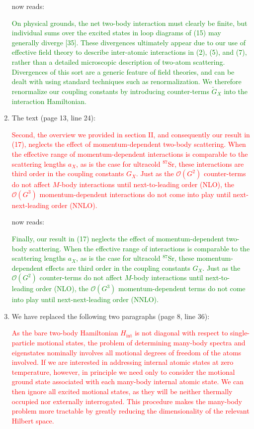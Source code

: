 \documentclass[preprint]{revtex4-1}
\renewcommand{\t}{\text} %
\newcommand{\p}[1]{\left(#1\right)} %
\renewcommand{\O}{\mathcal{O}}
\newcommand{\1}{\mathds{1}}
\newcommand{\red}[1]{\textcolor{red}{#1}}
\newcommand{\green}[1]{\textcolor{green}{#1}}
\newcounter{point}
\newcommand{\step}{\stepcounter{point}\setcounter{enumi}{0}}
\begin{document}
\begin{enumerate}[label=(R1.\arabic{point}.\arabic*)]
  now reads:

  \green{On physical grounds, the net two-body interaction must
    clearly be finite, but individual sums over the excited states in
    loop diagrams of (15) may generally diverge [35].  These
    divergences ultimately appear due to our use of effective field
    theory to describe inter-atomic interactions in (2), (5), and (7),
    rather than a detailed microscopic description of two-atom
    scattering.  Divergences of this sort are a generic feature of
    field theories, and can be dealt with using standard techniques
    such as renormalization.  We therefore renormalize our coupling
    constants by introducing counter-terms $\tilde G_X$ into the
    interaction Hamiltonian.}


\item The text (page 13, line 24):

  \red{Second, the overview we provided in section II, and
    consequently our result in (17), neglects the effect of
    momentum-dependent two-body scattering. When the effective range
    of momentum-dependent interactions is comparable to the scattering
    lengths $a_X$, as is the case for ultracold ${}^{87}$Sr, these
    interactions are third order in the coupling constants $G_X$. Just
    as the $\O\p{G^2}$ counter-terms do not affect $M$-body
    interactions until next-to-leading order (NLO), the $\O\p{G^3}$
    momentum-dependent interactions do not come into play until next-
    next-leading order (NNLO).}

  now reads:

  \green{Finally, our result in (17) neglects the effect of
    momentum-dependent two-body scattering.  When the effective range
    of interactions is comparable to the scattering lengths $a_X$, as
    is the case for ultracold ${}^{87}$Sr, these momentum-dependent
    effects are third order in the coupling constants $G_X$.  Just as
    the $\O\p{G^2}$ counter-terms do not affect $M$-body interactions
    until next-to-leading order (NLO), the $\O\p{G^3}$
    momentum-dependent terms do not come into play until
    next-next-leading order (NNLO).}


  \step
\item We have replaced the following two paragraphs (page 8, line 36):

  \red{As the bare two-body Hamiltonian $H_{\t{int}}$ is not diagonal
    with respect to single-particle motional states, the problem of
    determining many-body spectra and eigenstates nominally involves
    all motional degrees of freedom of the atoms involved.  If we are
    interested in addressing internal atomic states at zero
    temperature, however, in principle we need only to consider the
    motional ground state associated with each many-body internal
    atomic state.  We can then ignore all excited motional states, as
    they will be neither thermally occupied nor externally
    interrogated.  This procedure makes the many-body problem more
    tractable by greatly reducing the dimensionality of the relevant
    Hilbert space.}


\end{enumerate}
\end{document}
